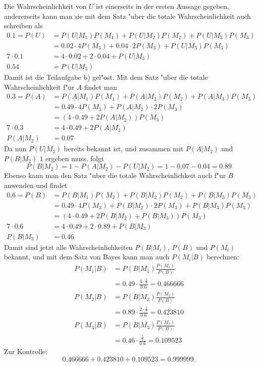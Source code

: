 \begin{loesung}
Die Wahrscheinlichkeit von $U$ ist einerseits in der ersten Aussage
gegeben, andererseits kann man sie mit dem Satz "uber die totale
Wahrscheinlichkeit auch schreiben als
\begin{align*}
0.1=P(U)
&=P(U|M_1)P(M_1)+P(U|M_2)P(M_2)+P(U|M_3)P(M_3)
\\
&=0.02\cdot 4P(M_3)+0.04\cdot 2P(M_3)+P(U|M_3)P(M_3)
\\
7\cdot 0.1&=4\cdot 0.02+2\cdot 0.04+P(U|M_3)
\\
0.54&=P(U|M_3)
\end{align*}
Damit ist die Teilaufgabe b) gel"ost.
Mit dem Satz "uber die totale Wahrscheinlichkeit f"ur $A$ findet man
\begin{align*}
0.3=P(A)&=
P(A|M_1)P(M_1)
+
P(A|M_2)P(M_2)
+
P(A|M_3)P(M_3)
\\
&=
0.49\cdot 4P(M_3)
+
P(A|M_2)\cdot 2P(M_3)
\\
&=
(4\cdot 0.49
+
2P(A|M_2))P(M_3)
\\
7\cdot 0.3
&=4\cdot 0.49+2P(A|M_2)
\\
P(A|M_2)&=0.07
\end{align*}
Da nun $P(U|M_2)$ bereits bekannt ist, und zusammen mit $P(A|M_2)$
und $P(B|M_2)$ $1$ ergeben muss, folgt
\[
P(B|M_2)=1-P(A|M_2)-P(U|M_2)=1-0.07-0.04=0.89
\]
Ebenso kann man den Satz "uber die totale Wahrscheinlichkeit auch
f"ur $B$ anwenden und findet
\begin{align*}
0.6=P(B)
&=
P(B|M_1)P(M_2)
+
P(B|M_2)P(M_2)
+
P(B|M_3)P(M_3)
\\
&=
0.49\cdot 4P(M_3)
+
P(B|M_2)\cdot 2P(M_3)
+
P(B|M_3)P(M_3)
\\
&=
(4\cdot 0.49
+
2P(B|M_2)
+
P(B|M_3))P(M_3)
\\
7\cdot 0.6
&=
4\cdot 0.49+2\cdot 0.89 +P(B|M_3)
\\
P(B|M_3)&=0.46
\end{align*}
Damit sind jetzt alle Wahrscheinlichkeiten $P(B|M_i)$, $P(B)$ und
$P(M_i)$ bekannt, und mit dem Satz von Bayes kann man auch $P(M_i|B)$
berechnen:
\begin{align*}
P(M_1|B)&=
P(B|M_1)\frac{P(M_1)}{P(B)}
\\
&=0.49\cdot\frac{4\cdot\frac17}{0.6}
=0.466666
\\
P(M_2|B)&=
P(B|M_2)\frac{P(M_2)}{P(B)}
\\
&=0.89\cdot\frac{2\cdot\frac17}{0.6}
=0.423810
\\
P(M_3|B)&=
P(B|M_3)\frac{P(M_3)}{P(B)}
\\
&=0.46\cdot\frac{\frac17}{0.6}
=0.109523
\end{align*}
Zur Kontrolle:
\[
0.466666+0.423810+0.109523=0.999999.
\]
\end{loesung}

